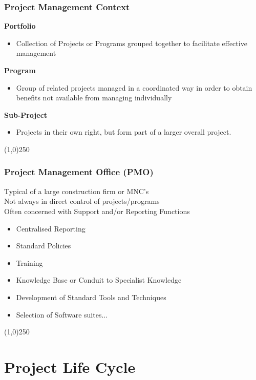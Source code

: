 \begin{frame}
\frametitle{Project Management Context}
\textbf{Portfolio}
\begin{itemize}
	\item Collection of Projects or Programs grouped together to facilitate effective management
\end{itemize}
\textbf{Program}
\begin{itemize}
	\item Group of related projects managed in a coordinated way in order to obtain benefits not available from managing individually
\end{itemize}
\textbf{Sub-Project}
\begin{itemize}
	\item Projects in their own right, but form part of a larger overall project.
\end{itemize}
\end{frame}
\begin{center}\line(1,0){250}\end{center}



\begin{frame}
\frametitle{Project Management Office (PMO)}
Typical of a large construction firm or MNC's\\
Not always in direct control of projects/programs\\
Often concerned with Support and/or Reporting Functions\\
\begin{itemize}
	\item Centralised Reporting
	\item Standard Policies
	\item Training
	\item Knowledge Base or Conduit to Specialist Knowledge
	\item Development of Standard Tools and Techniques
	\item Selection of Software suites...
\end{itemize}
\end{frame}
\begin{center}\line(1,0){250}\end{center}

\section{Project Life Cycle}


